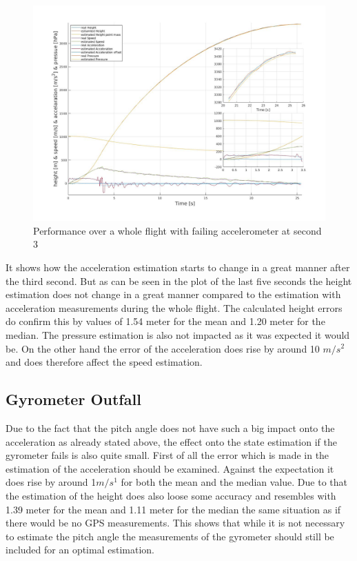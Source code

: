 \begin{figure}[h!]
 \centering
 \includegraphics[width=.8\textwidth]{./Pictures/BestSystemPerformanceAccOutfall.jpg}
 \caption{Performance over a whole flight with failing accelerometer at second 3}
 \label{fig:PerformanceAccOutfall}
\end{figure}

It shows how the acceleration estimation starts to change in a great manner after the third second.
But as can be seen in the plot of the last five seconds the height estimation does not change in a great manner
compared to the estimation with acceleration measurements during the whole flight.
The calculated height errors do confirm this by values of 1.54 meter for the mean and 1.20 meter for the median.
The pressure estimation is also not impacted as it was expected it would be.
On the other hand the error of the acceleration does rise by around 10 $m/s^2$ and does therefore affect the speed estimation.

\subsection{Gyrometer Outfall}
Due to the fact that the pitch angle does not have such a big impact onto the acceleration as already stated above,
the effect onto the state estimation if the gyrometer fails is also quite small.
First of all the error which is made in the estimation of the acceleration should be examined.
Against the expectation it does rise by around 1$m/s^1$ for both the mean and the median value.
Due to that the estimation of the height does also loose some accuracy and resembles with 1.39 meter for the mean
and 1.11 meter for the median the same situation as if there would be no GPS measurements.
This shows that while it is not necessary to estimate the pitch angle the measurements of the gyrometer should still be included for an optimal estimation.

